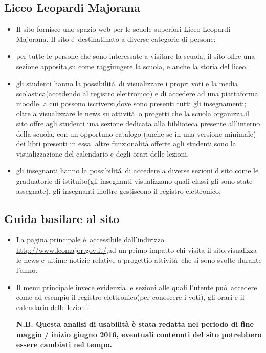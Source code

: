 \documentclass[12pt]{article}
\begin{document}
\subsection{Liceo Leopardi Majorana}
\begin{itemize}
	\item Il sito fornisce uno spazio web per le scuole superiori Liceo Leopardi Majorana. Il sito \'e\ destinatinato a diverse categorie di persone:
	\item per tutte le persone che sono interessate a visitare la scuola, il sito offre una sezione apposita,su come raggiungere la scuola, e anche la storia del liceo.
	\item gli studenti hanno la possibilit\'a\ di visualizzare i propri voti e la media scolastica(accedendo al registro elettronico) e di accedere ad una piattaforma moodle, a cui possono iscriversi,dove sono presenti tutti gli insegnamenti; oltre a visualizzare le news su attivit\'a\ o progetti che la scuola organizza.il sito offre agli studenti una sezione dedicata alla biblioteca presente all'interno della scuola, con un opportuno catalogo (anche se in una versione minimale) dei libri presenti in essa. altre funzionalità offerte agli studenti sono la visualizzazione del calendario e degli orari delle lezioni.
	\item gli insegnanti hanno la possibilit\'a\ di accedere a diverse sezioni d sito come le graduatorie di istituito(gli insegnanti visualizzano quali classi gli sono state assegnate). gli insegnanti inoltre gestiscono il registro elettronico.
\end{itemize}

\subsection{Guida basilare al sito}
\begin{itemize}

\item La pagina principale \'e\ accessibile dall'indirizzo  \url{http://www.leomajor.gov.it/},ad un primo impatto chi visita il sito,visualizza le news e ultime notizie relative a progettio attivit\'a\ che si sono svolte durante l'anno. 

\item Il menu principale invece evidenzia le sezioni alle quali l'utente pu\'o\ accedere come ad esempio il registro elettronico(per conoscere i voti), gli orari e il calendario delle lezioni.

\textbf{N.B. Questa analisi di usabilit\`a \`e stata redatta nel periodo di fine maggio / inizio giugno 2016, eventuali contenuti del sito potrebbero essere cambiati nel tempo.}

\end{itemize}
\newpage
\end{document}
